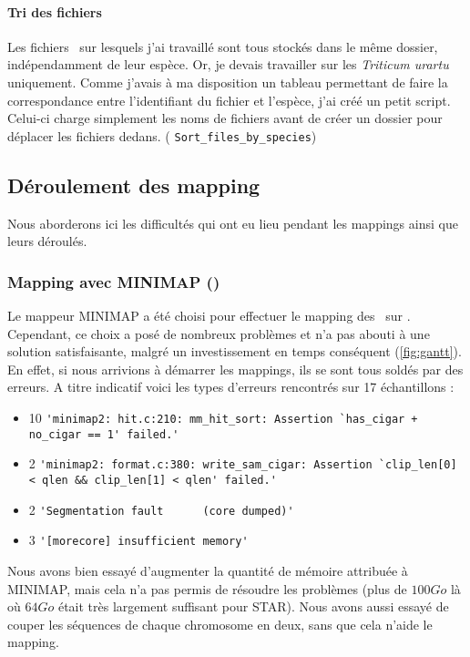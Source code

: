 \documentclass[../main]{subfiles} %
\begin{document}
\paragraph{Tri des fichiers}
Les fichiers \fastq sur lesquels j’ai travaillé sont tous stockés dans le même dossier, indépendamment de leur espèce. Or, je devais travailler sur les \textit{Triticum urartu} uniquement. Comme j’avais à ma disposition un tableau permettant de faire la correspondance entre l’identifiant du fichier et l’espèce, j’ai créé un petit script. Celui-ci charge simplement les noms de fichiers avant de créer un dossier pour déplacer les fichiers dedans. (\cite{florent_f-marchalm1bioinfointernship2024-inrae_agap_ge2pop_2024} \lstinline{Sort_files_by_species})


\subsection{Déroulement des \gls{mapping}}

Nous aborderons ici les difficultés qui ont eu lieu pendant les \glspl{mapping} ainsi que leurs déroulés.

\subsubsection{Mapping avec \gls{MINIMAP} (\GeMo)}
\label{sec:Minimap}

Le \gls{mappeur} \gls{MINIMAP} a été choisi pour effectuer le \gls{mapping} des \fastq sur \GeMo. Cependant, ce choix a posé de nombreux problèmes et n'a pas abouti à une solution satisfaisante, malgré un investissement en temps conséquent (\cref{fig:gantt}). En effet, si nous arrivions à démarrer les \glspl{mapping}, ils se sont tous soldés par des erreurs. A titre indicatif voici les types d’erreurs rencontrés sur 17 échantillons :

\begin{itemize}
    \item 10 \lstinline{'minimap2: hit.c:210: mm_hit_sort: Assertion `has_cigar + no_cigar == 1' failed.'}
    \item 2 \lstinline{'minimap2: format.c:380: write_sam_cigar: Assertion `clip_len[0] < qlen && clip_len[1] < qlen' failed.'}
    \item 2 \lstinline{'Segmentation fault      (core dumped)'}
    \item 3 \lstinline{'[morecore] insufficient memory'}
\end{itemize}

Nous avons bien essayé d’augmenter la quantité de mémoire attribuée à \gls{MINIMAP}, mais cela n’a pas permis de résoudre les problèmes (plus de $\num{100} Go$ là où $\num{64} Go$ était très largement suffisant pour \gls{STAR}). Nous avons aussi essayé de couper les séquences de chaque chromosome en deux, sans que cela n'aide le \gls{mapping}. 
\end{document}
